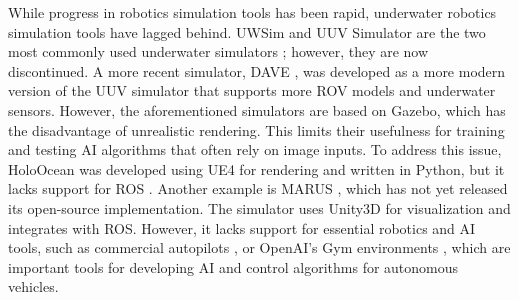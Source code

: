 While progress in robotics simulation tools has been rapid, underwater robotics simulation tools have lagged behind. UWSim \cite{uwsim} and UUV Simulator \cite{uuv} are the two most commonly used underwater simulators \cite{survey}; however, they are now discontinued. %
A more recent simulator, DAVE \cite{dave}, was developed as a more modern version of the UUV simulator that supports more \ac{ROV} models and underwater sensors. However, the aforementioned simulators are based on Gazebo, which has the disadvantage of unrealistic rendering. This limits their usefulness for training and testing \ac{AI} algorithms that often rely on image inputs. To address this issue, HoloOcean \cite{holoocean} was developed using \ac{UE4} for rendering and written in Python, but it lacks support for \ac{ROS} \cite{ros}. Another example is MARUS \cite{marus}, which has not yet released its open-source implementation. The simulator uses Unity3D for visualization and integrates with \ac{ROS}. However, it lacks support for essential robotics and \ac{AI} tools, such as commercial autopilots \cite{px4}, or OpenAI's Gym environments \cite{gym}, which are important tools for developing \ac{AI} and control algorithms for autonomous vehicles.
%
